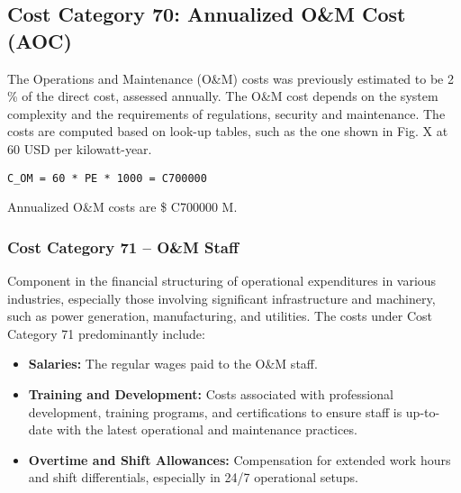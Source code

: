 
\subsection{Cost Category 70: Annualized O\&M Cost (AOC)}

The Operations and Maintenance (O\&M) costs was previously estimated to be 2 \% of the direct cost, assessed annually.  The O\&M cost depends on the system complexity and the requirements of regulations, security and maintenance. The costs are computed based on look-up tables, such as the one shown in Fig. X
at 60 USD per kilowatt-year.


\begin{verbatim} 
C_OM = 60 * PE * 1000 = C700000  
\end{verbatim} 

Annualized O\&M costs are \$ C700000 M.

\subsubsection*{Cost Category 71 – O\&M Staff}
Component in the financial structuring of operational expenditures in various industries, especially those involving significant infrastructure and machinery, such as power generation, manufacturing, and utilities.  The costs under Cost Category 71 predominantly include:

\begin{itemize}
    \item \textbf{Salaries:} The regular wages paid to the O\&M staff.
    \item \textbf{Training and Development:} Costs associated with professional development, training programs, and certifications to ensure staff is up-to-date with the latest operational and maintenance practices.
    \item \textbf{Overtime and Shift Allowances:} Compensation for extended work hours and shift differentials, especially in 24/7 operational setups.
\end{itemize}

